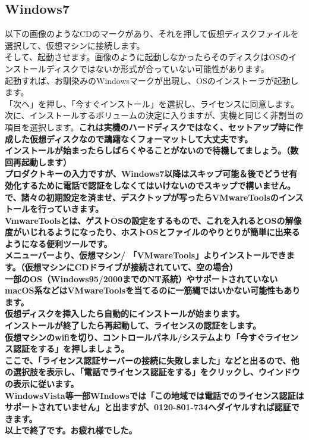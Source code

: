 \documentclass[b5paper,10pt]{jsarticle}
\begin{document}
\begin{multicols*}{3}
\begin{lstlistng}[saitama]
{\subsection{Windows7}
以下の画像のようなCDのマークがあり、それを押して仮想ディスクファイルを選択して、仮想マシンに接続します。\\
そして、起動させます。画像のように起動しなかったらそのディスクはOSのインストールディスクではないか形式が合っていない可能性があります。\\
起動すれば、お馴染みのWindowsマークが出現し、OSのインストーラが起動します。\\
「次へ」を押し、「今すぐインストール」を選択し、ライセンスに同意します。\\
次に、インストールするボリュームの決定に入りますが、実機と同じく非割当の項目を選択します。\bf{これは実機のハードディスクではなく、セットアップ時に作成した仮想ディスクなので躊躇なくフォーマットして大丈夫です。}\\
インストールが始まったらしばらくやることがないので待機してましょう。（数回再起動します）\\
プロダクトキーの入力ですが、Windows7以降はスキップ可能＆後でどうせ有効化するために電話で認証をしなくてはいけないのでスキップで構いません。\\
で、諸々の初期設定を済ませ、デスクトップが写ったらVMwareToolsのインストールを行っていきます。\\
VmwareToolsとは、ゲストOSの設定をするもので、これを入れるとOSの解像度がいじれるようになったり、ホストOSとファイルのやりとりが簡単に出来るようになる便利ツールです。\\
メニューバーより、仮想マシン/ 「VMwareTools」よりインストールできます。（仮想マシンにCDドライブが接続されていて、空の場合）\\
一部のOS（Windows95/2000までのNT系統）やサポートされていないmacOS系などはVMwareToolsを当てるのに一筋縄ではいかない可能性もあります。\\
仮想ディスクを挿入したら自動的にインストールが始まります。\\
インストールが終了したら再起動して、ライセンスの認証をします。\\
仮想マシンのwifiを切り、コントロールパネル/システムより「今すぐライセンス認証をする」を押しましょう。\\
ここで、「ライセンス認証サーバーの接続に失敗しました」などと出るので、他の選択肢を表示し、「電話でライセンス認証をする」をクリックし、ウインドウの表示に従います。\\
WindowsVista等一部WIndowsでは「この地域では電話でのライセンス認証はサポートされていません」と出ますが、0120-801-734へダイヤルすれば認証できます。\\
以上で終了です。お疲れ様でした。\\
}
\end{lstlistng}
\end{multicols*}
\end{document}
